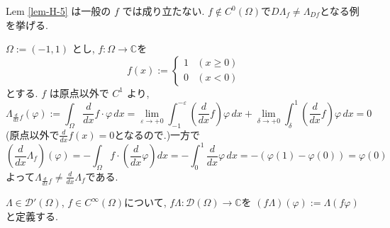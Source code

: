 \begin{ex}{\cite[6.11]{Rud}}
\label{ex-H-6}
Lem \ref{lem-H-5} は一般の \(f\) では成り立たない. 
$f \not \in C^0(\Omega)$で$D \Lambda_f \neq \Lambda_{D f}$となる例を挙げる. 

\(\Omega := (-1,1)\) とし, \(f : \Omega \to \mathbb{C}\)を
\[
 f(x) := \begin{cases} 1 & (x \ge 0) \\ 0 & (x < 0) \end{cases}
 \]
とする.
 \(f\) は原点以外で \(C^1\) より, 
\[
\Lambda_{\frac{d}{dx} f}(\varphi) := 
\int_\Omega \frac{d}{dx} f \cdot \varphi \, dx
= \lim_{\varepsilon \to +0} \int_{-1}^{-\varepsilon} \left( \frac{d}{dx} f \right) \varphi \, dx 
+ \lim_{\delta \to +0} \int_{\delta}^1 \left( \frac{d}{dx} f \right) \varphi \, dx
= 0 
\]
(原点以外で$\frac{d}{dx} f(x) = 0$となるので.)一方で
\[
\left( \frac{d}{dx} \Lambda_f \right)(\varphi) = - \int_\Omega f \cdot \left( \frac{d}{dx} \varphi \right) dx = - \int_0^1 \frac{d}{dx} \varphi \, dx
= - (\varphi(1) - \varphi(0)) = \varphi(0)
\]
よって\(\Lambda_{\frac{d}{dx} f} \neq \frac{d}{dx} \Lambda_f \)である. 
\end{ex}

\begin{tcolorbox}[mybox]
\begin{defn}{\cite[6.15]{Rud}}
\label{defn-H-7}
\(\Lambda \in \mathcal{D}'(\Omega)\), \(f \in C^\infty(\Omega)\)について, 
\(f \Lambda : \mathcal{D}(\Omega) \to \mathbb{C}\)を
\((f \Lambda)(\varphi) := \Lambda(f \varphi)\)と定義する.
\end{defn}
\end{tcolorbox}


